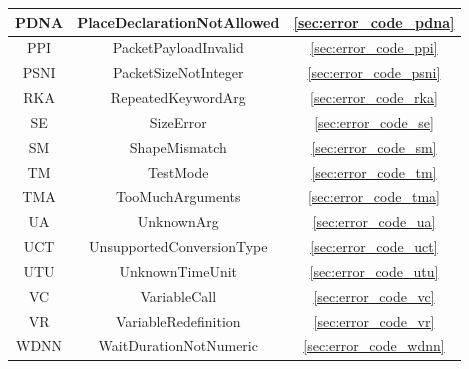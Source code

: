 \begin{table}[h!]
\begin{tabular}{|c|c|c|}
        PDNA & PlaceDeclarationNotAllowed & \ref{sec:error_code_pdna} \\ \hline
        PPI & PacketPayloadInvalid & \ref{sec:error_code_ppi} \\ \hline
        PSNI & PacketSizeNotInteger & \ref{sec:error_code_psni} \\ \hline
        RKA & RepeatedKeywordArg & \ref{sec:error_code_rka} \\ \hline
        SE & SizeError & \ref{sec:error_code_se} \\ \hline
        SM & ShapeMismatch & \ref{sec:error_code_sm} \\ \hline
        TM & TestMode & \ref{sec:error_code_tm} \\ \hline
        TMA & TooMuchArguments & \ref{sec:error_code_tma} \\ \hline
        UA & UnknownArg & \ref{sec:error_code_ua} \\ \hline
        UCT & UnsupportedConversionType & \ref{sec:error_code_uct} \\ \hline
        UTU & UnknownTimeUnit & \ref{sec:error_code_utu} \\ \hline
        VC & VariableCall & \ref{sec:error_code_vc} \\ \hline
        VR & VariableRedefinition & \ref{sec:error_code_vr} \\ \hline
        WDNN & WaitDurationNotNumeric & \ref{sec:error_code_wdnn} \\ \hline
    \end{tabular}
\end{table}



